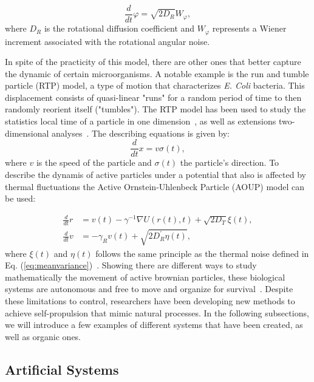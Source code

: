 \begin{equation}
  \frac{d}{dt}{\varphi} = \sqrt{2D_R}W _{\varphi},
  \label{eq:rotationaldiffusion}
\end{equation}
where $D_R$ is the rotational diffusion coefficient and $W_\varphi$ represents a Wiener increment associated with the rotational angular noise.

In spite of the practicity of this model, there are other ones that better capture the dynamic of certain microorganisms. A notable example is the run and tumble particle (RTP) model, a type of motion that characterizes \textit{E. Coli} bacteria. This displacement consists of quasi-linear "runs" for a random period of time to then randomly reorient itself ("tumbles"). The RTP model has been used to study the statistics local time of a particle in one dimension~\cite{singh2021local}, as well as extensions two-dimensional analyses~\cite{santra2020run}.
The describing equations is given by:
\begin{equation}
  \frac{d}{dt}x = v\sigma (t), 
  \label{eq:runandthumble}
\end{equation}
where $v$ is the speed of the particle and $\sigma (t)$ the particle's direction. 
To describe the dynamis of active particles under a potential that also is affected by thermal fluctuations the Active Ornstein-Uhlenbeck Particle (AOUP) model can be used:

\begin{align}
  \frac{d}{dt}r &= v(t) - \gamma^{-1} \nabla U(r(t), t) + \sqrt{2D_T} \xi (t),\\
  \frac{d}{dt}v &= -\gamma _R v(t) + \sqrt{2D^{'}_R \eta (t)},
\end{align}
where $\xi (t)$ and $\eta (t)$ follows the same principle as the thermal noise defined in Eq. (\ref{eq:meanvariance})~\cite{semeraro2021work}. Showing there are different ways to study mathematically the movement of active brownian particles, these biological systems are autonomous and free to move and organize for survival~\cite{munoz2016myxobacteria}. Despite these limitations to control, researchers have been developing new methods to achieve self-propulsion that mimic natural processes. In the following subsections, we will introduce a few examples of different systems that have been created, as well as organic ones.


\subsection{Artificial Systems}

